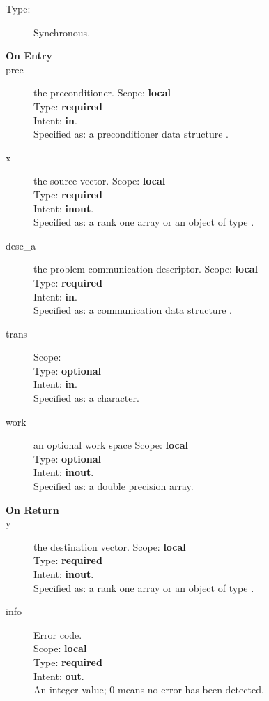 \begin{description}
\item[Type:] Synchronous.
\item[\bf On Entry]
\item[prec] the preconditioner.
Scope: {\bf local} \\
Type: {\bf required}\\
Intent: {\bf in}.\\
Specified as: a preconditioner data structure \precdata.
\item[x] the source vector.
Scope: {\bf local} \\
Type: {\bf required}\\
Intent: {\bf inout}.\\
Specified as:  a rank one array or an object of type \vdata. 
\item[desc\_a] the problem communication descriptor.
Scope: {\bf local} \\
Type: {\bf required}\\
Intent: {\bf in}.\\
Specified as: a communication data structure \descdata.
\item[trans] 
Scope: {\bf } \\
Type: {\bf optional}\\
Intent: {\bf in}.\\
Specified as: a character.
\item[work] an optional work space
Scope: {\bf local} \\
Type: {\bf optional}\\
Intent: {\bf inout}.\\
Specified as: a double precision array.
\end{description}

\begin{description}
\item[\bf On Return]
\item[y] the destination vector.
Scope: {\bf local} \\
Type: {\bf required}\\
Intent: {\bf inout}.\\
Specified as:  a rank one array or an object of type \vdata.
\item[info] Error code.\\
Scope: {\bf local} \\
Type: {\bf required} \\
Intent: {\bf out}.\\
An integer value; 0 means no error has been detected. 
\end{description}



